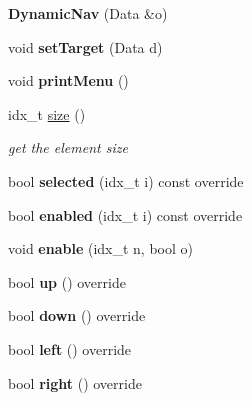 \begin{DoxyCompactItemize}
\item 
\mbox{\label{classDynamicNav_a8bb5a4ea4a9cefdf77b12d8f25a1b51b}} 
{\bfseries Dynamic\+Nav} (Data \&o)
\item 
\mbox{\label{classDynamicNav_a48b1cf857d2b1f34a90b8be04c0c468d}} 
void {\bfseries set\+Target} (Data d)
\item 
\mbox{\label{classDynamicNav_a64b7fcdb1064ba17bd7b18cb7fac66bd}} 
void {\bfseries print\+Menu} ()
\item 
idx\+\_\+t \hyperlink{classDynamicNav_a889041fa079206abea35978d17267fa0}{size} ()
\begin{DoxyCompactList}\small\item\em get the element size \end{DoxyCompactList}\item 
\mbox{\label{classDynamicNav_a17a2978dadba9dc26278154415cb68bf}} 
bool {\bfseries selected} (idx\+\_\+t i) const override
\item 
\mbox{\label{classDynamicNav_a7982c12b38a03c6e0f7754f64e920d2a}} 
bool {\bfseries enabled} (idx\+\_\+t i) const override
\item 
\mbox{\label{classDynamicNav_a9e096813faf026e65f8ed6be93b7ccf8}} 
void {\bfseries enable} (idx\+\_\+t n, bool o)
\item 
\mbox{\label{classDynamicNav_ac1ea476779657a66a3dc3ed71ec06f2c}} 
bool {\bfseries up} () override
\item 
\mbox{\label{classDynamicNav_ac738883ad62c648d6147d091a530c119}} 
bool {\bfseries down} () override
\item 
\mbox{\label{classDynamicNav_a981321c0198b541e2e7e79a7397b2b35}} 
bool {\bfseries left} () override
\item 
\mbox{\label{classDynamicNav_a9e93af959a6748d6fd62fef544220939}} 
bool {\bfseries right} () override
\item 

\end{DoxyCompactItemize}
